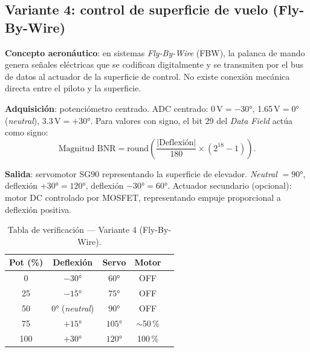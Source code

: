\documentclass[11pt]{article}
\begin{document}
\subsection{Variante 4: control de superficie de vuelo (Fly-By-Wire)}
\textbf{Concepto aeronáutico}: en sistemas \emph{Fly-By-Wire} (FBW), la palanca de mando
genera señales eléctricas que se codifican digitalmente y se transmiten por el bus de
datos al actuador de la superficie de control. No existe conexión mecánica directa entre
el piloto y la superficie.

\textbf{Adquisición}: potenciómetro centrado. ADC centrado: 0\,V$=-30\si{\degree}$,
1.65\,V$=0\si{\degree}$ (\emph{neutral}), 3.3\,V$=+30\si{\degree}$. Para valores con
signo, el bit 29 del \emph{Data Field} actúa como signo:
\begin{equation}
  \text{Magnitud BNR} = \text{round}\!\left(\frac{|\text{Deflexión}|}{180}\times(2^{18}-1)\right).
\end{equation}

\textbf{Salida}: servomotor SG90 representando la superficie de elevador. \emph{Neutral}
$=90\si{\degree}$, deflexión $+30\si{\degree}=120\si{\degree}$, deflexión
$-30\si{\degree}=60\si{\degree}$. Actuador secundario (opcional): motor DC controlado por
MOSFET, representando empuje proporcional a deflexión positiva.

\begin{table}[H]\centering
\caption{Tabla de verificación — Variante 4 (Fly-By-Wire).}
\begin{tabular}{ccccc}
\toprule
Pot (\%) & Deflexión & Servo & Motor \\
\midrule
0 & $-30\si{\degree}$ & $60\si{\degree}$ & OFF \\
25 & $-15\si{\degree}$ & $75\si{\degree}$ & OFF \\
50 & $0\si{\degree}$ (\emph{neutral}) & $90\si{\degree}$ & OFF \\
75 & $+15\si{\degree}$ & $105\si{\degree}$ & \(\sim\)50\,\% \\
100 & $+30\si{\degree}$ & $120\si{\degree}$ & 100\,\% \\
\bottomrule
\end{tabular}
\end{table}
\end{document}
